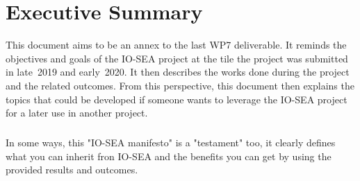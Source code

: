 \chapter*{Executive Summary}


This document aims to be an annex to the last WP7 deliverable. It reminds the objectives and goals of the IO-SEA
project at the tile the project was submitted in late~2019 and early~2020. It then describes  the works 
done during the project and the related outcomes. From this perspective, this document then explains the topics that could be developed if someone wants to leverage the IO-SEA project for a later use in another project. 

\paragraph{}
In some ways, this "IO-SEA manifesto" is a "testament" too, it clearly defines what you can inherit fron IO-SEA
and the benefits you can get by using the provided results and outcomes.  